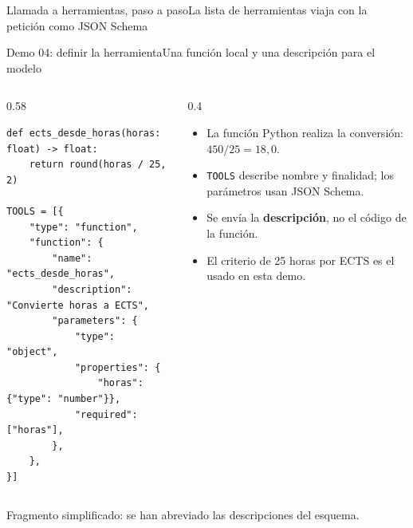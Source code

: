 \begin{frame}{Llamada a herramientas, paso a paso}{La lista de herramientas viaja con la petición como JSON Schema}
	{\centering
		\par}
\end{frame}

\begin{frame}[fragile]{Demo 04: definir la herramienta}{Una función local y una descripción para el modelo}
	\begin{columns}[T]
		\begin{column}{0.58\textwidth}
			\begin{lstlisting}
def ects_desde_horas(horas: float) -> float:
    return round(horas / 25, 2)

TOOLS = [{
    "type": "function",
    "function": {
        "name": "ects_desde_horas",
        "description": "Convierte horas a ECTS",
        "parameters": {
            "type": "object",
            "properties": {
                "horas": {"type": "number"}},
            "required": ["horas"],
        },
    },
}]
\end{lstlisting}
		\end{column}
		\begin{column}{0.4\textwidth}
			\footnotesize
			\begin{itemize}
				\item La función Python realiza la conversión: $450 / 25 = 18{,}0$.
				\item \texttt{TOOLS} describe nombre y finalidad; los parámetros usan JSON Schema.
				\item Se envía la \textbf{descripción}, no el código de la función.
				\item El criterio de 25 horas por ECTS es el usado en esta demo.
			\end{itemize}
		\end{column}
	\end{columns}
	{\scriptsize Fragmento simplificado: se han abreviado las descripciones del esquema.}
\end{frame}

